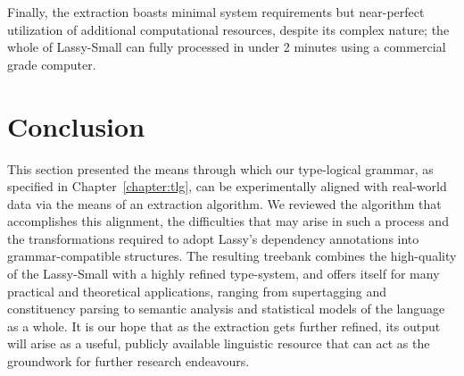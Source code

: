 Finally, the extraction boasts minimal system requirements but near-perfect utilization of additional computational resources, despite its complex nature; the whole of Lassy-Small can fully processed in under 2 minutes using a commercial grade computer.

\section{Conclusion}
This section presented the means through which our type-logical grammar, as specified in Chapter~\ref{chapter:tlg}, can be experimentally aligned with real-world data via the means of an extraction algorithm.
We reviewed the algorithm that accomplishes this alignment, the difficulties that may arise in such a process and the transformations required to adopt Lassy's dependency annotations into grammar-compatible structures.
The resulting treebank combines the high-quality of the Lassy-Small with a highly refined type-system, and offers itself for many practical and theoretical applications, ranging from supertagging and constituency parsing to semantic analysis and statistical models of the language as a whole.
It is our hope that as the extraction gets further refined, its output will arise as a useful, publicly available linguistic resource that can act as the groundwork for further research endeavours.